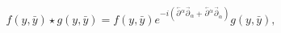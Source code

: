 \begin{equation}
f(y,\bar y) \star g(y,\bar y) = 
f(y,\bar y) e^{-i(\stackrel{\, _\leftarrow}{\partial}{\!}^\alpha  
\!\!\! \stackrel{\, _\rightarrow}{\partial}{\!}_\alpha 
+ \stackrel{\, _\leftarrow}{\partial}{\!}^{\dot\alpha} 
\!\!\! \stackrel{\, _\rightarrow}{\partial}{\!}_{\dot\alpha})} 
g(y,\bar y), \label{eq:fstarg}
\end{equation}

